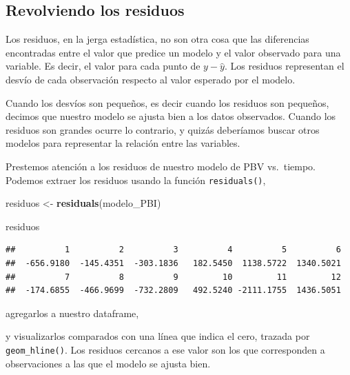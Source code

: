 \documentclass[]{book}
\newenvironment{Shaded}{\begin{snugshade}}{\end{snugshade}}
\newcommand{\KeywordTok}[1]{\textcolor[rgb]{0.13,0.29,0.53}{\textbf{#1}}}
\newcommand{\DataTypeTok}[1]{\textcolor[rgb]{0.13,0.29,0.53}{#1}}
\newcommand{\StringTok}[1]{\textcolor[rgb]{0.31,0.60,0.02}{#1}}
\newcommand{\OperatorTok}[1]{\textcolor[rgb]{0.81,0.36,0.00}{\textbf{#1}}}
\newcommand{\NormalTok}[1]{#1}
\begin{document}
\subsection{Revolviendo los residuos}\label{revolviendo-los-residuos}

Los residuos, en la jerga estadística, no son otra cosa que las
diferencias encontradas entre el valor que predice un modelo y el valor
observado para una variable. Es decir, el valor para cada punto de
\(y - \widehat{y}\). Los residuos representan el desvío de cada
observación respecto al valor esperado por el modelo.

Cuando los desvíos son pequeños, es decir cuando los residuos son
pequeños, decimos que nuestro modelo se ajusta bien a los datos
observados. Cuando los residuos son grandes ocurre lo contrario, y
quizás deberíamos buscar otros modelos para representar la relación
entre las variables.

Prestemos atención a los residuos de nuestro modelo de PBV vs.~tiempo.
Podemos extraer los residuos usando la función \texttt{residuals()},

\begin{Shaded}
\begin{Highlighting}[]
\NormalTok{residuos <-}\StringTok{ }\KeywordTok{residuals}\NormalTok{(modelo_PBI)}

\NormalTok{residuos}
\end{Highlighting}
\end{Shaded}

\begin{verbatim}
##          1          2          3          4          5          6 
##  -656.9180  -145.4351  -303.1836   182.5450  1138.5722  1340.5021 
##          7          8          9         10         11         12 
##  -174.6855  -466.9699  -732.2809   492.5240 -2111.1755  1436.5051
\end{verbatim}

agregarlos a nuestro dataframe,

\begin{Shaded}
\end{Shaded}

y visualizarlos comparados con una línea que indica el cero, trazada por
\texttt{geom\_hline()}. Los residuos cercanos a ese valor son los que
corresponden a observaciones a las que el modelo se ajusta bien.
\end{document}
